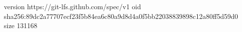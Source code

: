version https://git-lfs.github.com/spec/v1
oid sha256:89dc2a77707ecf23f5b84ea6c80a9d8d4a0f5bb22038839898c12a80ff5d59d0
size 131168
